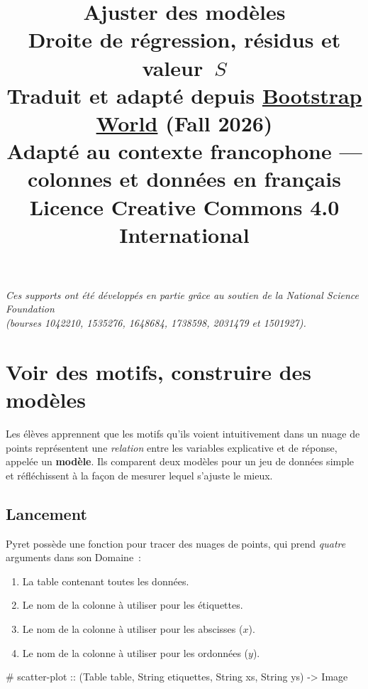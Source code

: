 \documentclass[12pt,a4paper]{article}
\title{%
  \vspace{-2cm}
  {\Huge\bfseries Ajuster des modèles}\\[0.5em]
  {\large Droite de régression, résidus et valeur~$S$}\\[1em]
  {\normalsize Traduit et adapté depuis \href{https://www.bootstrapworld.org/materials/fall2026/en-us/lessons/fitting-models/}{Bootstrap World} (Fall 2026)}\\
  {\normalsize Adapté au contexte francophone — colonnes et données en français}\\[0.5em]
  {\normalsize Licence Creative Commons 4.0 International}
}
\date{}
\author{}
\newcommand{\contrat}[1]{%
  \begin{contractbox}
    \ttfamily #1
  \end{contractbox}
}
\begin{document}
\maketitle
\thispagestyle{empty}

\vspace{2cm}
\begin{center}
  \textit{Ces supports ont été développés en partie grâce au soutien de la National Science Foundation\\
  (bourses 1042210, 1535276, 1648684, 1738598, 2031479 et 1501927).}
\end{center}

\newpage
\tableofcontents
\newpage

\section{Voir des motifs, construire des modèles}

\begin{overviewbox}
  Les élèves apprennent que les motifs qu'ils voient intuitivement dans un nuage de points représentent une \emph{relation} entre les variables explicative et de réponse, appelée un \textbf{modèle}. Ils comparent deux modèles pour un jeu de données simple et réfléchissent à la façon de mesurer lequel s'ajuste le mieux.
\end{overviewbox}

\subsection{Lancement}

\begin{keypointbox}
Pyret possède une fonction pour tracer des nuages de points, qui prend \emph{quatre} arguments dans son Domaine~:
\begin{enumerate}
  \item La table contenant toutes les données.
  \item Le nom de la colonne à utiliser pour les étiquettes.
  \item Le nom de la colonne à utiliser pour les abscisses ($x$).
  \item Le nom de la colonne à utiliser pour les ordonnées ($y$).
\end{enumerate}

\contrat{\# scatter-plot :: (Table table, String etiquettes, String xs, String ys) -> Image}
\end{keypointbox}
\end{document}
